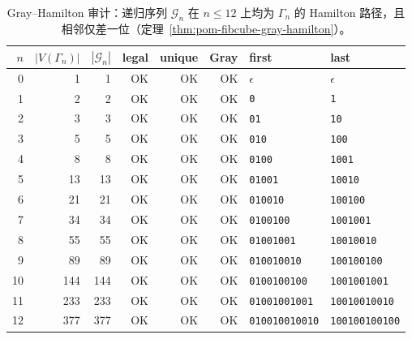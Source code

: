 \begin{table}[H]
\centering
\scriptsize
\setlength{\tabcolsep}{5pt}
\caption{Gray--Hamilton 审计：递归序列 $\mathcal G_n$ 在 $n\le 12$ 上均为 $\Gamma_n$ 的 Hamilton 路径，且相邻仅差一位（定理~\ref{thm:pom-fibcube-gray-hamilton}）。}
\label{tab:fibonacci_cube_gray_hamilton_audit}
\begin{tabular}{r r r r r r l l}
\toprule
$n$ & $|V(\Gamma_n)|$ & $|\mathcal G_n|$ & legal & unique & Gray & first & last\\
\midrule
0 & 1 & 1 & OK & OK & OK & \texttt{\ensuremath{\epsilon}} & \texttt{\ensuremath{\epsilon}}\\
1 & 2 & 2 & OK & OK & OK & \texttt{0} & \texttt{1}\\
2 & 3 & 3 & OK & OK & OK & \texttt{01} & \texttt{10}\\
3 & 5 & 5 & OK & OK & OK & \texttt{010} & \texttt{100}\\
4 & 8 & 8 & OK & OK & OK & \texttt{0100} & \texttt{1001}\\
5 & 13 & 13 & OK & OK & OK & \texttt{01001} & \texttt{10010}\\
6 & 21 & 21 & OK & OK & OK & \texttt{010010} & \texttt{100100}\\
7 & 34 & 34 & OK & OK & OK & \texttt{0100100} & \texttt{1001001}\\
8 & 55 & 55 & OK & OK & OK & \texttt{01001001} & \texttt{10010010}\\
9 & 89 & 89 & OK & OK & OK & \texttt{010010010} & \texttt{100100100}\\
10 & 144 & 144 & OK & OK & OK & \texttt{0100100100} & \texttt{1001001001}\\
11 & 233 & 233 & OK & OK & OK & \texttt{01001001001} & \texttt{10010010010}\\
12 & 377 & 377 & OK & OK & OK & \texttt{010010010010} & \texttt{100100100100}\\
\bottomrule
\end{tabular}
\end{table}
